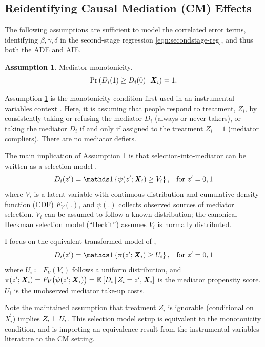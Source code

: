 \subsection{Reidentifying Causal Mediation (CM) Effects}
The following assumptions are sufficient to model the correlated error terms, identifying $\beta, \gamma, \delta$ in the second-stage regression \eqref{eqn:secondstage-reg}, and thus both the ADE and AIE.

\theoremstyle{definition}
\newtheorem{assumptionCF}{Assumption}
\renewcommand\theassumptionCF{CF--\arabic{assumptionCF}}
\begin{assumptionCF}
    \label{cf:monotonicity}
    Mediator monotonicity.
    \[ \Pr\left(  D_i(1) \geq D_i(0)  \, \middle\vert \, \boldsymbol{\mathit{X}}_i \right) = 1. \]
\end{assumptionCF}
\noindent
Assumption \ref{cf:monotonicity} is the monotonicity condition first used in an instrumental variables context \citep{imbens1994identification}.
Here, it is assuming that people respond to treatment, $Z_i$, by consistently taking or refusing the mediator $D_i$ (always or never-takers), or taking the mediator $D_i$ if and only if assigned to the treatment $Z_i=1$ (mediator compliers).
There are no mediator defiers.

The main implication of Assumption \ref{cf:monotonicity} is that selection-into-mediator can be written as a selection model \citep{vytlacil2002independence}.
\[ D_i(z') = \indicator{ \psi(z'; \vec X_i) \geq V_i},
    \;\;\; \text{for } z'=0,1 \]
where $V_i$ is a latent variable with continuous distribution and cumulative density function (CDF) $F_V(.)$, and $\psi(.)$ collects observed sources of mediator selection.
$V_i$ can be assumed to follow a known distribution; the canonical Heckman selection model (``Heckit'') assumes $V_i$ is normally distributed.

I focus on the equivalent transformed model of \cite{heckman2005structural},
\[ D_i(z') = \indicator{ \pi(z'; \vec X_i) \geq U_i},
    \;\;\; \text{for } z'=0,1 \]
where $U_i \coloneqq F_V(V_i)$ follows a uniform distribution, and $\pi(z'; \boldsymbol{\mathit{X}}_i) = F_V\big(\psi(z'; \boldsymbol{\mathit{X}}_i)\big) = \mathbb{E}_{} \left[ D_i \, \middle\vert \, Z_i = z', \boldsymbol{\mathit{X}}_i \right]$ is the mediator propensity score.
$U_i$ is the unobserved mediator take-up costs.

Note the maintained assumption that treatment $Z_i$ is ignorable (conditional on $\vec X_i$) implies $Z_i \indep U_i$.
This selection model setup is equivalent to the monotonicity condition, and is importing an equivalence result from the instrumental variables literature to the CM setting.

